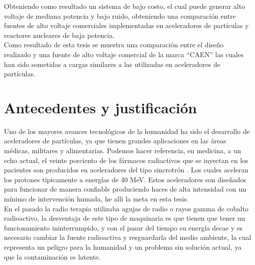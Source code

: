 Obteniendo como resultado un sistema de bajo costo, el cual puede generar alto voltaje de mediana potencia y bajo ruido, obteniendo una comparación entre fuentes de alto voltaje comerciales implementadas en aceleradores de partículas y reactores nucleares de baja potencia. \\

Como resultado de esta tesis se muestra una comparación entre el diseño realizado y una fuente de alto voltaje comercial de la marca ``CAEN'' las cuales han sido sometidas a cargas similares a las utilizadas en aceleradores de partículas.\newpage




\section{Antecedentes y justificación}


Uno de los mayores avances tecnológicos de la humanidad ha sido el desarrollo de aceleradores de partículas, ya que tienen grandes aplicaciones en las áreas médicas, militares y alimentarias. Podemos hacer referencia, en medicina, a un echo actual, el veinte porciento de los fármacos radiactivos que se inyectan en los pacientes son producidos en aceleradores del tipo sincrotrón \cite{ProyectoLNLS5}. Los cuales aceleran los protones típicamente a energías de 40 MeV. Estos aceleradores son diseñados para funcionar de manera confiable produciendo haces de alta intensidad con un mínimo de intervención humada, he allí la meta en esta tesis.\\

En el pasado la radio terapia utilizaba agujas de radio o rayos gamma de cobalto radioactivo, la desventaja de este tipo de maquinaria es que tienen que tener un funcionamiento ininterrumpido, y con el pasar del tiempo su energía decae y es necesario cambiar la fuente radioactiva y resguardarla del medio ambiente, la cual representa un peligro para la humanidad y un problema sin solución actual, ya que la contaminación es latente.\\

